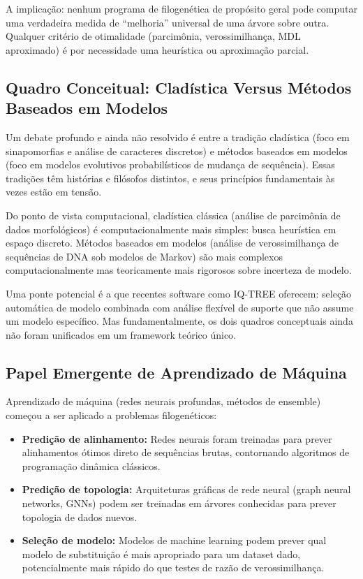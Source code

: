 A implicação: nenhum programa de filogenética de propósito geral pode computar uma verdadeira medida de ``melhoria'' universal de uma árvore sobre outra. Qualquer critério de otimalidade (parcimônia, verossimilhança, MDL aproximado) é por necessidade uma heurística ou aproximação parcial.

\subsection{Quadro Conceitual: Cladística Versus Métodos Baseados em Modelos}

Um debate profundo e ainda não resolvido é entre a tradição cladística (foco em sinapomorfias e análise de caracteres discretos) e métodos baseados em modelos (foco em modelos evolutivos probabilísticos de mudança de sequência). Essas tradições têm histórias e filósofos distintos, e seus princípios fundamentais às vezes estão em tensão.

Do ponto de vista computacional, cladística clássica (análise de parcimônia de dados morfológicos) é computacionalmente mais simples: busca heurística em espaço discreto. Métodos baseados em modelos (análise de verossimilhança de sequências de DNA sob modelos de Markov) são mais complexos computacionalmente mas teoricamente mais rigorosos sobre incerteza de modelo.

Uma ponte potencial é a que recentes software como IQ-TREE oferecem: seleção automática de modelo combinada com análise flexível de suporte que não assume um modelo específico. Mas fundamentalmente, os dois quadros conceptuais ainda não foram unificados em um framework teórico único.

\subsection{Papel Emergente de Aprendizado de Máquina}

Aprendizado de máquina (redes neurais profundas, métodos de ensemble) começou a ser aplicado a problemas filogenéticos:

\begin{itemize}
\item \textbf{Predição de alinhamento:} Redes neurais foram treinadas para prever alinhamentos ótimos direto de sequências brutas, contornando algoritmos de programação dinâmica clássicos.
\item \textbf{Predição de topologia:} Arquiteturas gráficas de rede neural (graph neural networks, GNNs) podem ser treinadas em árvores conhecidas para prever topologia de dados nuevos.
\item \textbf{Seleção de modelo:} Modelos de machine learning podem prever qual modelo de substituição é mais apropriado para um dataset dado, potencialmente mais rápido do que testes de razão de verossimilhança.
\end{itemize}

